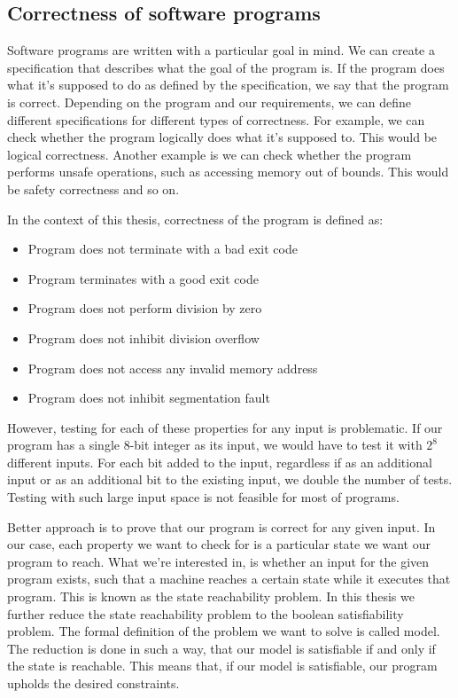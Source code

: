 \documentclass[12pt]{article}
\begin{document}
\subsection{Correctness of software programs}

Software programs are written with a particular goal in mind. We can create a 
specification that describes what the goal of the program is. If the program 
does what it's supposed to do as defined by the specification, we say that the
program is correct. Depending on the program and our requirements, we can define
different specifications for different types of correctness. For example, we can
check whether the program logically does what it's supposed to. This would be 
logical correctness. Another example is we can check whether the program
performs unsafe operations, such as accessing memory out of bounds. This would
be safety correctness and so on.

In the context of this thesis, correctness of the program is defined as:

\begin{itemize}
    \item Program does not terminate with a bad exit code
    \item Program terminates with a good exit code
    \item Program does not perform division by zero
    \item Program does not inhibit division overflow
    \item Program does not access any invalid memory address
    \item Program does not inhibit segmentation fault
\end{itemize}

However, testing for each of these properties for any input is problematic. If
our program has a single 8-bit integer as its input, we would have to test it 
with $2^{8}$ different inputs. For each bit added to the input, regardless
if as an additional input or as an additional bit to the existing input, we
double the number of tests. Testing with such large input space is not feasible
for most of programs.

Better approach is to prove that our program is correct for any given input. In
our case, each property we want to check for is a particular state we want our
program to reach. What we're interested in, is whether an input for the given
program exists, such that a machine reaches a certain state while it executes
that program. This is known as the state reachability problem. In this thesis
we further reduce the state reachability problem to the boolean satisfiability
problem. The formal definition of the problem we want to solve is called model.
The reduction is done in such a way, that our model is satisfiable if and only
if the state is reachable. This means that, if our model is satisfiable, our
program upholds the desired constraints.
\end{document}
